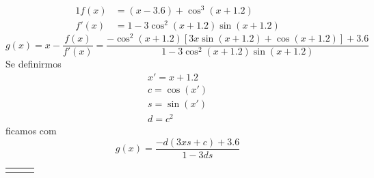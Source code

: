 \setcounter{chapter}{16}
\begin{alignat*}{1}
	f(x) &= (x-3.6)+\cos^3(x+1.2)\\
	f'(x) &= 1-3\cos^2(x+1.2)\sin(x+1.2)
\end{alignat*}
\begin{equation*}
	g(x)
	= x-\frac{f(x)}{f'(x)}
	= \frac{-\cos^2(x+1.2)[3x\sin(x+1.2)+\cos(x+1.2)]+3.6}{1-3\cos^2(x+1.2)\sin(x+1.2)}
\end{equation*}
Se definirmos
\begin{gather*}
	x' = x+1.2\\
	c = \cos(x')\\
	s = \sin(x')\\
	d = c^2
\end{gather*}
ficamos com
\begin{equation*}
	g(x)
	= \frac{-d(3xs+c)+3.6}{1-3ds}
\end{equation*}

\begin{center}
\begin{tabular}{ p{73mm} p{0mm} p{73mm} }
	 & &
	
\end{tabular}
\end{center}

